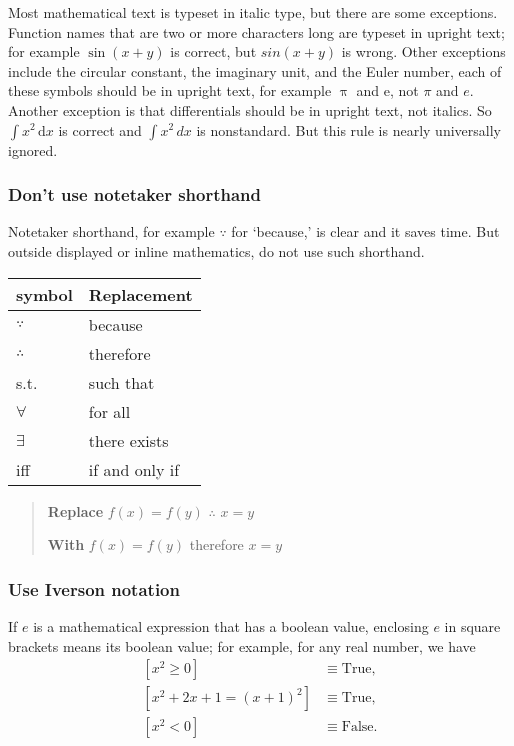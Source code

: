 \documentclass[12pt,fleqn]{article}
\newcounter{ex}\setcounter{ex}{0}
\newcounter{id}\setcounter{id}{0}
\newcounter{se}\setcounter{se}{0}
\begin{document}
 Most mathematical text is typeset in italic type, but there are some exceptions. Function names that are two or more characters long are  typeset in upright text; for example \(\sin(x+y)\) is correct, but \(sin(x+y)\) is wrong.  Other
 exceptions include the circular constant, the imaginary unit,  and the Euler number, each  of these symbols should be in upright text, 
 for example \(\uppi\) and  \(\mathrm{e}\), not \(\pi\) and \(e\).  Another exception is  that differentials should be in 
 upright text, not italics.  So \(\int x^2 \, \mathrm{d} x\) is correct and \(\int x^2 \, d x\) is nonstandard. But this rule is nearly universally ignored.

 \subsubsection{Don't use notetaker shorthand}

 Notetaker shorthand, for example $\because$ for `because,' is  clear and it saves time.  But outside displayed or inline mathematics,  do not use such shorthand.

 \begin{center}
  \begin{tabular}{| l l |}
  \hline  \textbf {symbol} &  \textbf{Replacement} \\ 
  \hline
  $\because$  & because \\
  $\therefore$  &  therefore \\
  s.t.          & such that \\
  $\forall$     & for all \\
  $\exists$      & there exists \\
  iff      & if and only if  \\ \hline 
 \end{tabular}
\end{center}

\begin{quote}
  \textbf{Replace} $f(x) = f(y)$  $\therefore$  $x = y$

  \textbf{With} $f(x) = f(y)$ therefore  $x = y$

\end{quote}

\subsubsection{Use Iverson notation}

If $e$ is a mathematical expression that has a boolean value, enclosing
$e$ in square brackets means its boolean value; for example, for any
real number, we have 
\begin{align*}
   \left[x^2 \geq 0 \right] &\equiv \mbox{True}, \\
   \left[x^2 + 2 x + 1 = (x+1)^2 \right] &\equiv \mbox{True}, \\
   \left[x^2 < 0 \right] &\equiv \mbox{False}.
\end{align*}
\end{document}
